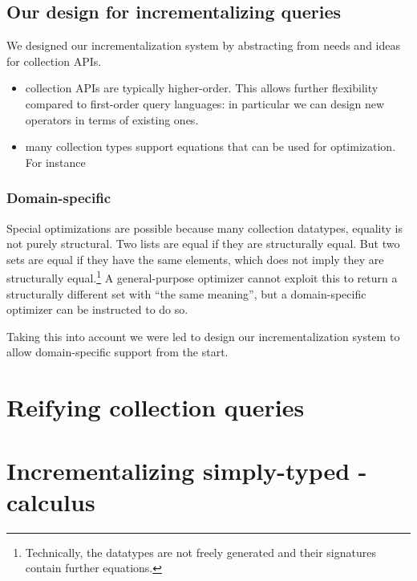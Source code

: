 \documentclass{book}
\begin{document}
\section{Our design for incrementalizing queries}
We designed our incrementalization system by abstracting from needs and ideas for
collection APIs.
\begin{itemize}
\item collection APIs are typically higher-order. This allows further
  flexibility compared to first-order query languages: in particular we can
  design new operators in terms of existing ones.
\item many collection types support equations that can be used for optimization.
  For instance
\end{itemize}

\subsection{Domain-specific}
Special optimizations are possible because many collection datatypes, equality
is not purely structural. Two lists are equal if they are structurally equal.
But two sets are equal if they have the same elements, which does not imply they
are structurally equal.\footnote{
  Technically, the datatypes are not freely generated and their signatures
  contain further equations.}
%
A general-purpose optimizer cannot exploit this to return a structurally
different set with ``the same meaning'', but a domain-specific optimizer can be
instructed to do so.

Taking this into account we were led to design our incrementalization system to
allow domain-specific support from the start.

\chapter{Reifying collection queries}





\newcommand{\co}[1]{\code{#1}} %
\chapter{Incrementalizing simply-typed \TitleLambda{}-calculus}








\end{document}

